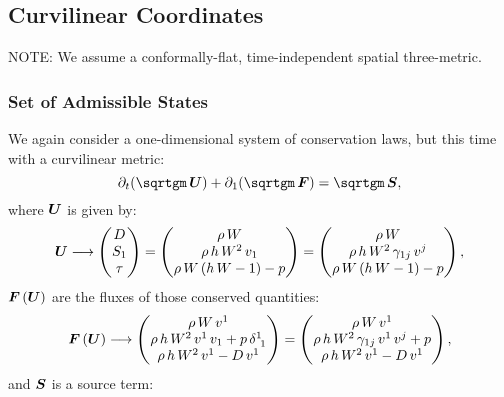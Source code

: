 \documentclass[10pt,preprint]{aastex}
\begin{document}
\newpage


\subsection{Curvilinear Coordinates}
NOTE: We assume a conformally-flat, time-independent spatial three-metric.

\subsubsection{Set of Admissible States}
We again consider a one-dimensional system of conservation laws, but this time with a curvilinear metric:
\begin{equation*}
    \pd{\left(\sqrtgm\,\vect{U}\right)}{t}+\pd{\left(\sqrtgm\,\vect{F}\right)}{1}=\sqrtgm\,\vect{S},
\end{equation*}
where $\boldsymbol{U}$ is given by:
\begin{equation*}
    \boldsymbol{U}\longrightarrow\begin{pmatrix} D\\ S_{1}\\ \tau\end{pmatrix}=\begin{pmatrix} \rho\,W\\ \rho\,h\,W^{2}\,v_{1}\\ \rho\,W\left(h\,W-1\right)-p\end{pmatrix}=\begin{pmatrix} \rho\,W\\ \rho\,h\,W^{2}\,\gamma_{1j}\,v^{j}\\ \rho\,W\left(h\,W-1\right)-p\end{pmatrix},
\end{equation*}
$\boldsymbol{F}\left(\boldsymbol{U}\right)$ are the fluxes of those conserved quantities:
\begin{equation*}
    \boldsymbol{F}\left(\boldsymbol{U}\right)\longrightarrow\begin{pmatrix}\rho\,W\,v^{1}\\ \rho\,h\,W^{2}\,v^{1}\,v_{1}+p\,\delta^{1}_{~1}\\\rho\,h\,W^{2}\,v^{1}-D\,v^{1}\end{pmatrix}=\begin{pmatrix}\rho\,W\,v^{1}\\ \rho\,h\,W^{2}\,\gamma_{1j}\,v^{1}\,v^{j}+p\\\rho\,h\,W^{2}\,v^{1}-D\,v^{1}\end{pmatrix},
\end{equation*}
and $\boldsymbol{S}$ is a source term:
\end{document}
